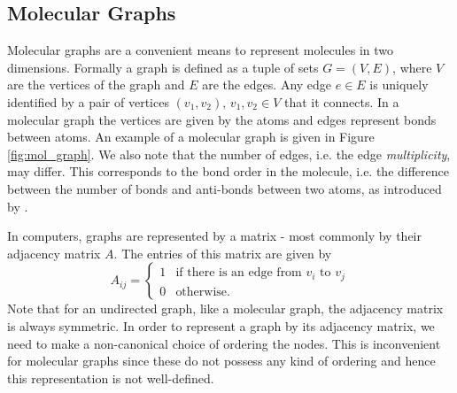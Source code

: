 \subsection{Molecular Graphs}
\label{sec:mol_graphs}
Molecular graphs are a convenient means to represent molecules in two dimensions. Formally a graph is defined as a tuple of sets $G = (V,E)$, where $V$ are the vertices of the graph and $E$ are the edges. Any edge $e \in E$ is uniquely identified by a pair of vertices $(v_1, v_2), \, v_1, v_2 \in V$ that it connects. In a molecular graph the vertices are given by the atoms and edges represent bonds between atoms. An example of a molecular graph is given in Figure \ref{fig:mol_graph}. We also note that the number of edges, i.e. the edge \emph{multiplicity}, may differ. This corresponds to the bond order in the molecule, i.e. the difference between the number of bonds and anti-bonds between two atoms, as introduced by \cite{pauling}. 

In computers, graphs are represented by a matrix - most commonly by their adjacency matrix $A$. The entries of this matrix are given by 
\begin{equation}
A_{ij} = 
\begin{cases}
1 & \text{if there is an edge from } v_i \text{ to } v_j \\
0 & \text{otherwise.}
\end{cases}
\end{equation}
Note that for an undirected graph, like a molecular graph, the adjacency matrix is always symmetric. In order to represent a graph by its adjacency matrix, we need to make a non-canonical choice of ordering the nodes. This is inconvenient for molecular graphs since these do not possess any kind of ordering and hence this representation is not well-defined. 

